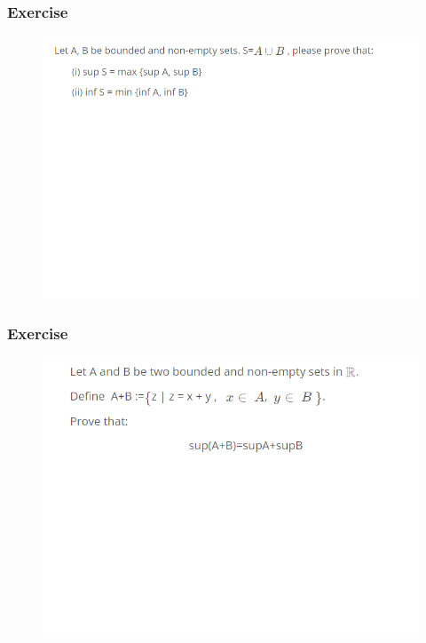\documentclass{beamer}
\begin{document}
\begin{frame}
    \frametitle{Exercise}
    \begin{figure}[htbp]
        \centering
        \includegraphics[width=12cm]{exercise3.png}
    \end{figure}
\end{frame}

\begin{frame}
    \frametitle{Exercise}
    \begin{figure}[htbp]
        \centering
        \includegraphics[width=12cm]{exercise.png}
    \end{figure}
\end{frame}
\end{document}
